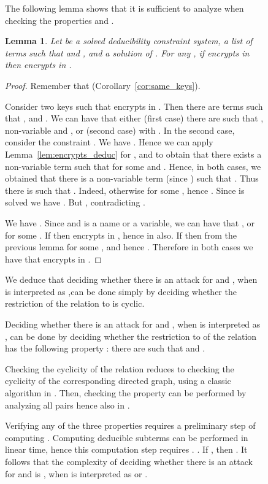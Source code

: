 \documentclass[acmtocl,acmnow]{acmtrans2m}
\newtheorem{lemma}[theorem]{Lemma}
\newcommand{\dedsys}[1]{deducibility constraint system}
\begin{document}
\begin{figure}[t]
{{The
following lemma shows that it is sufficient to analyze  when checking the properties  and
.
\begin{lemma}\label{lem:tau_sol_encrypts}
Let  be a solved \dedsys{},  a list of terms such that  and
, and  a solution of . For any
, if  encrypts  in  then  encrypts
 in .
\end{lemma}
\begin{proof}
Remember that  (Corollary~\ref{cor:same_keys}).

Consider two keys  such that  encrypts  in .
Then there are terms  such that ,  and
. We can have that either (first case) there are  such that ,
 non-variable and , or (second case)  with
. In the second case, consider the constraint . We have
. Hence we can apply Lemma~\ref{lem:encrypts_deduc} for , 
and  to obtain that there exists a non-variable term  such that  for some 
and . Hence, in both cases, we obtained that there is a non-variable term
 (since ) such that . Thus there is 
such that . Indeed, otherwise  for some , hence . Since  is solved we have . But , contradicting .

We have . Since  and  is a name or a variable, we can have that
, or  for some .
If  then  encrypts  in , hence in  also.
If  then from the previous lemma  for some ,
and hence . Therefore in both
cases we have that  encrypts  in .
\end{proof}



We deduce that deciding whether there is an attack for   and ,
when  is interpreted as ,can be done simply by
deciding whether the restriction of the relation  to  is
cyclic.


Deciding whether there is an attack for  and  , when  is interpreted as  , can be done by deciding
whether the  restriction to  of the relation  has the following
property : there are  such that  and .


Checking the cyclicity of the relation  reduces to  checking the
cyclicity of the
corresponding directed graph, using a classic algorithm in . Then,
checking the property
 can be performed by analyzing all pairs  hence also in .

\smallskip





Verifying any of the three properties requires a preliminary step of computing
. Computing deducible subterms can be performed in linear
time, hence this computation step requires . . If ,
then . It follows that the complexity of deciding
whether there is an attack for  and  is , when  is
interpreted as  or .









}}
\end{figure}
\end{document}
